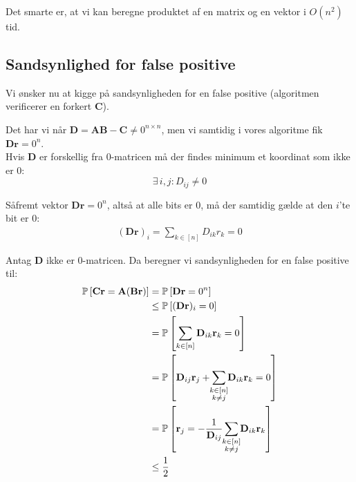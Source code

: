 Det smarte er, at vi kan beregne produktet af en matrix og en vektor i $O(n^2)$ tid.


\subsection{Sandsynlighed for false positive}
Vi ønsker nu at kigge på sandsynligheden for en false positive (algoritmen verificerer en forkert $\mathbf C$).

Det har vi når $\mathbf D = \mathbf{AB} - \mathbf C \neq 0^{n \times n}$, men vi samtidig i vores algoritme fik $\mathbf{Dr} = 0^n$.\\

Hvis $\mathbf D$ er forskellig fra 0-matricen må der findes minimum et koordinat som ikke er 0:
$$
\exists \, i,j : D_{ij} \neq 0
$$

Såfremt vektor $\mathbf{Dr} = 0^n$, altså at alle bits er 0, må der samtidig gælde at den $i$'te bit er 0:
\begin{align*}
  (\mathbf{Dr})_i = \sum_{k \in [n]} D_{ik} r_k = 0
\end{align*}

Antag $\mathbf D$ ikke er 0-matricen. Da beregner vi sandsynligheden for en false positive til:
\begin{align}
  \P{\mathbf{Cr} = \mathbf A (\mathbf{Br})}
  &= \P{\mathbf{Dr} = 0^n} \label{eq:matrix-to-vec} \\
  &\leq \P{(\mathbf{Dr})_i = 0} \label{eq:vec-to-cord} \\
  &= \P{\sum_{k \in [n]} \mathbf D_{ik} \mathbf r_k = 0} \label{eq:vec-mul} \\
  &= \P{\mathbf D_{ij} \mathbf r_j + \summ{k \in [n]\\ k \neq j} \mathbf D_{ik} \mathbf r_k = 0 } \label{eq:split-sum} \\
  &= \P{\mathbf r_j = - \frac{1}{\mathbf D_{ij}} \summ{k \in [n]\\ k \neq j} \mathbf D_{ik} \mathbf r_k} \label{eq:minus-og-div} \\
  &\leq \frac{1}{2} \label{eq:benyt-unikt-rj}
\end{align}

